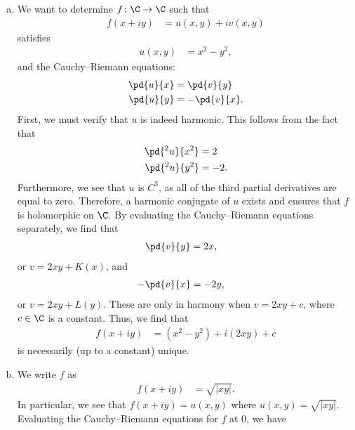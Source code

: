 \documentclass[10pt]{mypackage}
\begin{document}
\begin{solution}\hfill
  \begin{enumerate}[(a)]
    \item We want to determine $f\colon \C\rightarrow \C$ such that
      \begin{align*}
        f\left( x + iy \right) &= u\left( x,y \right) + iv\left( x,y \right)
      \end{align*}
      satisfies
      \begin{align*}
        u\left( x,y \right) &= x^2 - y^2,
      \end{align*}
      and the Cauchy--Riemann equations:
      \begin{align*}
        \pd{u}{x} &= \pd{v}{y}\\
        \pd{u}{y} &= -\pd{v}{x}.
      \end{align*}
      First, we must verify that $u$ is indeed harmonic. This follows from the fact that
      \begin{align*}
        \pd{^2u}{x^2} &= 2\\
        \pd{^2u}{y^2} &= -2.
      \end{align*}
      Furthermore, we see that $u$ is $C^{3}$, as all of the third partial derivatives are equal to zero. Therefore, a harmonic conjugate of $u$ exists and ensures that $f$ is holomorphic on $\C$. By evaluating the Cauchy--Riemann equations separately, we find that
      \begin{align*}
        \pd{v}{y} &= 2x,
      \end{align*}
      or $ v = 2xy + K(x)$, and
      \begin{align*}
        -\pd{v}{x} &= -2y,
      \end{align*}
      or $v = 2xy + L(y)$. These are only in harmony when $v = 2xy + c$, where $c\in \C$ is a constant. Thus, we find that
      \begin{align*}
        f\left( x + iy \right) &= \left( x^2 - y^2 \right) + i\left( 2xy \right) + c
      \end{align*}
      is necessarily (up to a constant) unique.
    \item We write $f$ as
      \begin{align*}
        f\left( x + iy \right) &= \sqrt{\left\vert xy \right\vert}.
      \end{align*}
      In particular, we see that $f\left( x + iy \right) = u\left( x,y \right)$ where $u\left( x,y \right) = \sqrt{\left\vert xy \right\vert}$. Evaluating the Cauchy--Riemann equations for $f$ at $0$, we have

\end{enumerate}
\end{solution}
\end{document}
